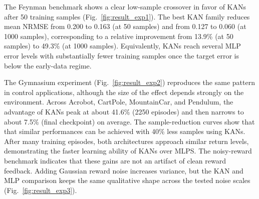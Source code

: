 \documentclass{article}
\begin{document}
%
%
The Feynman benchmark shows a clear low-sample crossover in favor of KANs after 50 training samples (Fig.~\ref{fig:result_exp1}).
The best KAN family reduces mean NRMSE from 0.200 to 0.163 (at 50 samples) and from 0.127 to 0.060 (at 1000 samples), corresponding to a relative improvement from 13.9\% (at 50 samples) to 49.3\% (at 1000 samples).
Equivalently, KANs reach several MLP error levels with substantially fewer training samples once the target error is below the early-data regime.

The Gymnasium experiment (Fig.~\ref{fig:result_exp2}) reproduces the same pattern in control applications, although the size of the effect depends strongly on the environment.
Across Acrobot, CartPole, MountainCar, and Pendulum, the advantage of KANs peak at about 41.6\% (2250 episodes) and then narrows to about 7.5\% (final checkpoint) on average.
The sample-reduction curves show that that similar performances can be achieved with 40\% less samples using KANs.
After many training episodes, both architectures approach similar return levels, demonstrating the faster learning ability of KANs over MLPS.
%
The noisy-reward benchmark indicates that these gains are not an artifact of clean reward feedback.
Adding Gaussian reward noise increases variance, but the KAN and MLP comparison keeps the same qualitative shape across the tested noise scales (Fig.~\ref{fig:result_exp3}).
\end{document}
